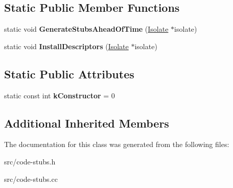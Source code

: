 \subsection*{Static Public Member Functions}
\begin{DoxyCompactItemize}
\item 
\hypertarget{classv8_1_1internal_1_1_internal_array_constructor_stub_base_a7eb1dafd46ef9adeba9ab1c5a24b5b5c}{}static void {\bfseries Generate\+Stubs\+Ahead\+Of\+Time} (\hyperlink{classv8_1_1internal_1_1_isolate}{Isolate} $\ast$isolate)\label{classv8_1_1internal_1_1_internal_array_constructor_stub_base_a7eb1dafd46ef9adeba9ab1c5a24b5b5c}

\item 
\hypertarget{classv8_1_1internal_1_1_internal_array_constructor_stub_base_aad553c44333ea1812178107711d4ca95}{}static void {\bfseries Install\+Descriptors} (\hyperlink{classv8_1_1internal_1_1_isolate}{Isolate} $\ast$isolate)\label{classv8_1_1internal_1_1_internal_array_constructor_stub_base_aad553c44333ea1812178107711d4ca95}

\end{DoxyCompactItemize}
\subsection*{Static Public Attributes}
\begin{DoxyCompactItemize}
\item 
\hypertarget{classv8_1_1internal_1_1_internal_array_constructor_stub_base_a65e4dc3b107482188f4cd806a9796add}{}static const int {\bfseries k\+Constructor} = 0\label{classv8_1_1internal_1_1_internal_array_constructor_stub_base_a65e4dc3b107482188f4cd806a9796add}

\end{DoxyCompactItemize}
\subsection*{Additional Inherited Members}


The documentation for this class was generated from the following files\+:\begin{DoxyCompactItemize}
\item 
src/code-\/stubs.\+h\item 
src/code-\/stubs.\+cc\end{DoxyCompactItemize}
